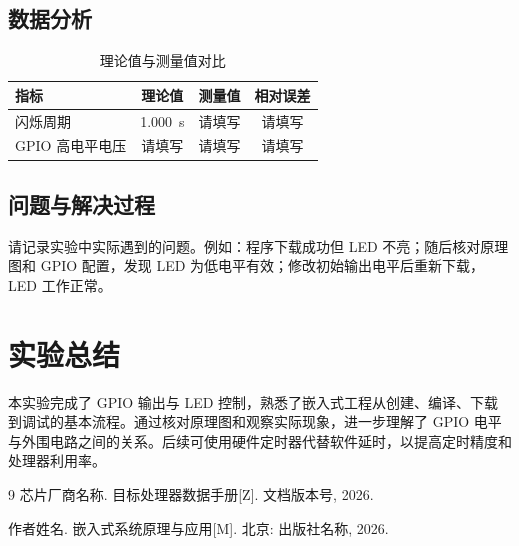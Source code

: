 \documentclass[UTF8,zihao=-4,a4paper,oneside,fontset=fandol]{ctexart}
\begin{document}

\subsection{数据分析}
\begin{table}[H]
  \centering
  \caption{理论值与测量值对比}
  \label{tab:result}
  \begin{tabular}{lccc}
    \toprule
    指标 & 理论值 & 测量值 & 相对误差 \\
    \midrule
    闪烁周期 & \SI{1.000}{\second} & 请填写 & 请填写 \\
    GPIO 高电平电压 & 请填写 & 请填写 & 请填写 \\
    \bottomrule
  \end{tabular}
\end{table}

\subsection{问题与解决过程}
请记录实验中实际遇到的问题。例如：程序下载成功但 LED 不亮；随后核对原理图和 GPIO 配置，发现 LED 为低电平有效；修改初始输出电平后重新下载，LED 工作正常。

\section{实验总结}
本实验完成了 GPIO 输出与 LED 控制，熟悉了嵌入式工程从创建、编译、下载到调试的基本流程。通过核对原理图和观察实际现象，进一步理解了 GPIO 电平与外围电路之间的关系。后续可使用硬件定时器代替软件延时，以提高定时精度和处理器利用率。

\clearpage
\begin{thebibliography}{9}
  芯片厂商名称. 目标处理器数据手册[Z]. 文档版本号, 2026.

  作者姓名. 嵌入式系统原理与应用[M]. 北京: 出版社名称, 2026.
\end{thebibliography}
\end{document}
